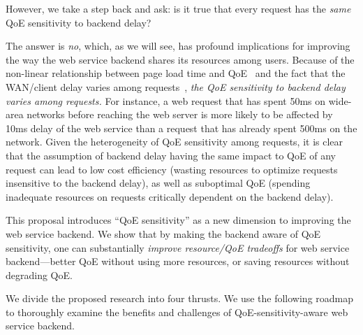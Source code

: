 However, we take a step back and ask: is it true that every request has the {\em same} QoE sensitivity to backend delay?

The answer is {\em no}, which, as we will see, has profound implications for improving the way the web service backend shares its resources among users. 
Because of the non-linear relationship between page load time and QoE~\cite{??} and the fact that the WAN/client delay varies among requests~\cite{timecard,dqbarge}, {\em the QoE sensitivity to backend delay varies among requests.}
For instance, a web request that has spent 50ms on wide-area networks before reaching the web server is more likely to be affected by 10ms delay of the web service than a request that has already spent 500ms on the network. 
Given the heterogeneity of QoE sensitivity among requests, it is clear that the assumption of backend delay having the same impact to QoE of any request can lead to low cost efficiency (wasting resources to optimize requests insensitive to the backend delay), as well as suboptimal QoE (spending inadequate resources on requests critically dependent on the backend delay). 


This proposal introduces ``QoE sensitivity'' as a new dimension to improving the web service backend. 
We show that by making the backend aware of QoE sensitivity, one can substantially {\em improve resource/QoE tradeoffs} for web service backend---\ie better QoE without using more resources, or saving resources without degrading QoE. 

We divide the proposed research into four thrusts.
We use the following roadmap to thoroughly examine the benefits and challenges of QoE-sensitivity-aware web service backend.


